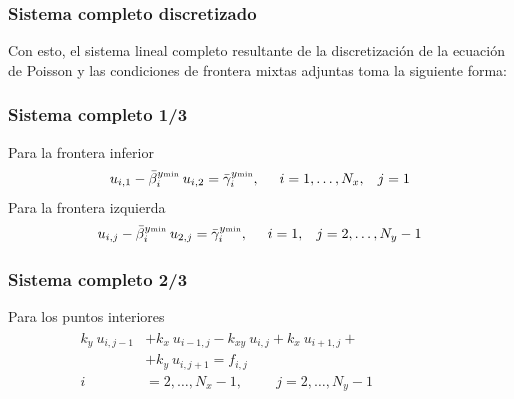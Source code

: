 \begin{frame}
\frametitle{Sistema completo discretizado}
Con esto, el sistema lineal completo resultante de la discretización de la ecuación de Poisson y las condiciones de frontera mixtas adjuntas toma la siguiente forma:
\end{frame}
\begin{frame}
\frametitle{Sistema completo 1/3}
Para la frontera inferior
\begin{align}
u_{i, 1} - \bar{\beta}_{i}^{y {\text{\tiny{min}}}} \: u_{i, 2} = \bar{\gamma}_{i}^{y {\text{\tiny{min}}}}, \hspace{0.5cm} i = 1, \ldots, N_{x}, \hspace{0.3cm} j = 1
\label{eq:ecuacion_13_09}
\end{align}
\pause
Para la frontera izquierda
\begin{align}
u_{i, j} - \bar{\beta}_{i}^{y {\text{\tiny{min}}}} \: u_{2, j} = \bar{\gamma}_{i}^{y {\text{\tiny{min}}}}, \hspace{0.5cm} i = 1, \hspace{0.3cm} j = 2, \ldots, N_{y} - 1
\label{eq:ecuacion_13_10}
\end{align}
\end{frame}
\begin{frame}
\frametitle{Sistema completo 2/3}
Para los puntos interiores
\begin{align}
\begin{aligned}
k_{y} \: u_{i, j-1} &+ k_{x} \: u_{i-1, j} - k_{xy} \: u_{i, j} + k_{x} \: u_{i+1, j} + \\
&+ k_{y} \: u_{i, j+1} =  f_{i,j} \\
i &= 2, \ldots, N_{x} - 1, \hspace{1cm} j = 2, \ldots, N_{y} - 1 \hspace{2cm}
\end{aligned}
\label{eq:ecuacion_13_11}
\end{align}
\end{frame}
